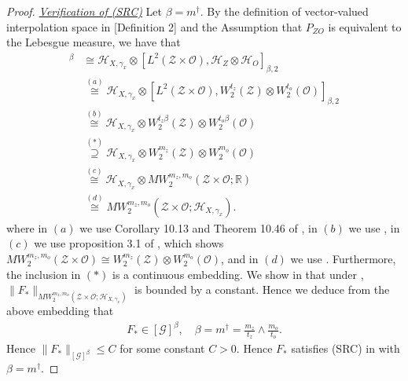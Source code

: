 \documentclass[11pt]{article}
\newcommand{\meffective}{m^{\dag}}
\newcommand{\calZ}{\mathcal{Z}}
\newcommand{\calH}{\mathcal{H}}
\newcommand{\calG}{\mathcal{G}}
\newcommand{\calO}{\mathcal{O}}
\newcommand{\0}{\mathbf{0}}
\begin{document}
\begin{appendix}
\begin{proof}
\vspace{3mm}
\noindent
\underline{\textit{Verification of (SRC)}}
Let $\beta = \meffective$. By the definition of vector-valued interpolation space in \cite{JMLR:v25:23-1663}[Definition 2] and the Assumption that $P_{ZO}$ is equivalent to the Lebesgue measure, we have that
\begin{align*}
    [\calG]^{\beta} &\cong \calH_{X,\gamma_x} \otimes [L^2(\calZ\times\calO), \calH_Z \otimes \calH_O]_{\beta, 2} \\
    &\stackrel{(a)}{\cong} \calH_{X,\gamma_x} \otimes [L^2(\calZ\times\calO), W^{t_z}_2(\calZ) \otimes W^{t_o}_2(\calO)]_{\beta, 2} \\
    &\stackrel{(b)}{\cong} \calH_{X,\gamma_x} \otimes W^{t_z \beta}_2(\calZ) \otimes W^{t_o \beta}_2(\calO)\\
    &\stackrel{(\ast)}{\supseteq} \calH_{X,\gamma_x}\otimes W^{m_z}_2(\calZ) \otimes W^{m_o}_2(\calO)\\
    &\stackrel{(c)}{\cong} \calH_{X,\gamma_x}\otimes MW^{m_z,m_o}_{2}(\calZ\times \calO;\mathbb{R})\\
    &\stackrel{(d)}{\cong} MW^{m_z,m_o}_{2}(\calZ\times \calO;\calH_{X,\gamma_x}).
\end{align*}
where in $(a)$ we use Corollary 10.13 and Theorem 10.46 of \cite{wendland2004scattered}, in $(b)$ we use , in $(c)$ we use proposition 3.1 of \cite{SICKEL2009748}, which shows $MW^{m_z, m_o}_2(\calZ\times\calO) \cong W^{m_z}_2(\calZ) \otimes W^{m_o}_2(\calO)$, and in $(d)$ we use . Furthermore, the inclusion in $(\ast)$ is a continuous embedding. We show in  that under , $\|F_{\ast}\|_{MW^{m_z,m_o}_{2}(\calZ\times \calO;\calH_{X,\gamma_x})}$ is bounded by a constant. Hence we deduce from the above embedding that 
\begin{align}\label{eq:F_ast_power_space}
    F_{\ast}\in [\calG]^{\beta}, \quad \beta = \meffective = \frac{m_z}{t_z} \wedge \frac{m_o}{t_o}.
\end{align}
Hence $\|F_{\ast}\|_{[\calG]^{\beta}} \leq C$ for some constant $C>0$. Hence $F_{\ast}$ satisfies (SRC) in \cite{JMLR:v25:23-1663} with $\beta=\meffective$.


\end{proof}
\end{appendix}
\end{document}
